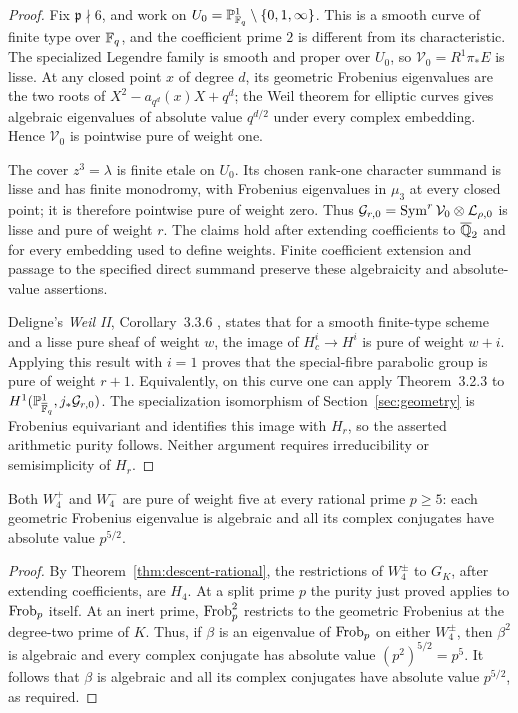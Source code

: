 \begin{proof}
Fix $\mathfrak p\nmid6$, and work on
$U_0=\mathbb P^1_{\mathbb F_q}\setminus\{0,1,\infty\}$. This is a smooth
curve of finite type over $\mathbb F_q$, and the coefficient prime $2$
is different from its characteristic. The specialized Legendre
family is smooth and proper over $U_0$, so
$\mathcal V_0=R^1\pi_*E$ is lisse. At any closed point $x$ of
degree $d$, its geometric Frobenius eigenvalues are the two
roots of $X^2-a_{q^d}(x)X+q^d$; the Weil theorem for elliptic
curves gives algebraic eigenvalues of absolute value $q^{d/2}$
under every complex embedding. Hence $\mathcal V_0$ is
pointwise pure of weight one.

The cover $z^3=\lambda$ is finite etale on $U_0$. Its chosen
rank-one character summand is lisse and has finite monodromy,
with Frobenius eigenvalues in $\mu_3$ at every closed point;
it is therefore pointwise pure of weight zero. Thus
$\mathcal G_{r,0}=\operatorname{Sym}^r\mathcal V_0\otimes\mathcal L_{\rho,0}$
is lisse and pure of weight $r$. The claims hold after extending
coefficients to $\overline{\mathbb Q}_2$ and for every embedding used
to define weights. Finite coefficient extension and passage to
the specified direct summand preserve these algebraicity and absolute-value assertions.

Deligne's \emph{Weil II}, Corollary~3.3.6 \cite{DeligneWII}, states that for a
smooth finite-type scheme and a lisse pure sheaf of weight $w$,
the image of $H_c^i\to H^i$ is pure of weight $w+i$.
Applying this result with $i=1$ proves that the special-fibre
parabolic group is pure of weight $r+1$. Equivalently, on this
curve one can apply Theorem~3.2.3 to
$H^1(\mathbb P^1_{\overline{\mathbb F}_q},j_*\mathcal G_{r,0})$.
The specialization isomorphism of Section~\ref{sec:geometry}
is Frobenius equivariant and identifies this image with $H_r$,
so the asserted arithmetic purity follows. Neither argument
requires irreducibility or semisimplicity of $H_r$.
\end{proof}

\begin{corollary}\label{cor:descent-good-prime-purity}
Both $W_4^+$ and $W_4^-$ are pure of weight five at every rational
prime $p\ge5$: each geometric Frobenius eigenvalue is algebraic
and all its complex conjugates have absolute value $p^{5/2}$.
\end{corollary}

\begin{proof}
By Theorem~\ref{thm:descent-rational}, the restrictions of
$W_4^\pm$ to $G_K$, after extending coefficients, are $H_4$.
At a split prime $p$ the purity just proved applies to
$\operatorname{Frob}_p$ itself. At an inert prime, $\operatorname{Frob}_p^2$ restricts to
the geometric Frobenius at the degree-two prime of $K$.
Thus, if $\beta$ is an eigenvalue of $\operatorname{Frob}_p$ on either
$W_4^\pm$, then $\beta^2$ is algebraic and every complex
conjugate has absolute value $(p^2)^{5/2}=p^5$.
It follows that $\beta$ is algebraic and all its complex
conjugates have absolute value $p^{5/2}$, as required.
\end{proof}

